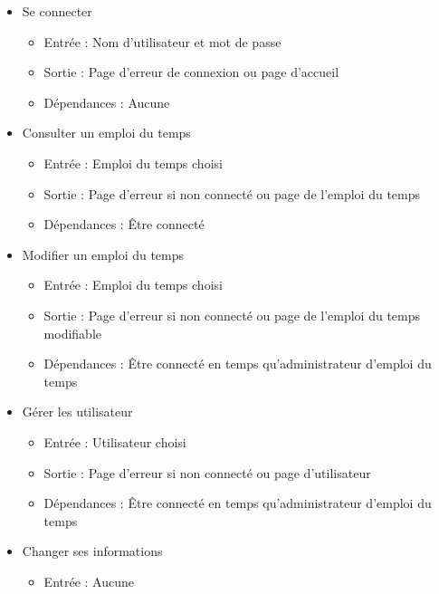 \documentclass[a4paper, 11pt]{article}
\begin{document}
	\begin{itemize}
		\item Se connecter
		\begin{itemize}
			\item Entrée : Nom d'utilisateur et mot de passe
			\item Sortie : Page d'erreur de connexion ou page d'accueil
			\item Dépendances : Aucune
		\end{itemize}
		\item Consulter un emploi du temps
		\begin{itemize}
			\item Entrée : Emploi du temps choisi
			\item Sortie : Page d'erreur si non connecté ou page de l'emploi du temps
			\item Dépendances : Être connecté
		\end{itemize}
		\item Modifier un emploi du temps
		\begin{itemize}
			\item Entrée : Emploi du temps choisi
			\item Sortie : Page d'erreur si non connecté ou page de l'emploi du temps modifiable
			\item Dépendances : Être connecté en temps qu'administrateur d'emploi du temps
		\end{itemize}
		\item Gérer les utilisateur
		\begin{itemize}
			\item Entrée : Utilisateur choisi
			\item Sortie : Page d'erreur si non connecté ou page d'utilisateur
			\item Dépendances : Être connecté en temps qu'administrateur d'emploi du temps
		\end{itemize}
		\item Changer ses informations
		\begin{itemize}
			\item Entrée : Aucune

\end{itemize}
\end{itemize}
\end{document}

